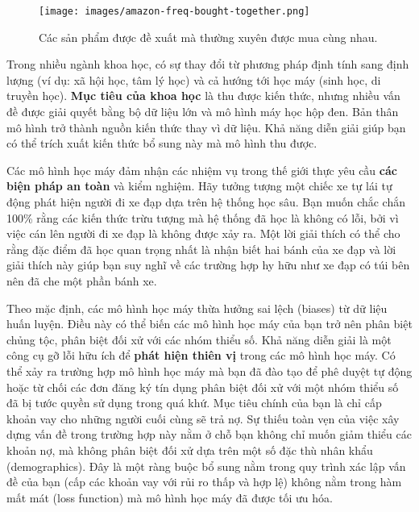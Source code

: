 \begin{figure*}[h!]
	\centering
	\texttt{[image: images/amazon-freq-bought-together.png]}
	\caption{Các sản phẩm được đề xuất mà thường xuyên được mua cùng nhau.}
\end{figure*}

Trong nhiều ngành khoa học, có sự thay đổi từ phương pháp định tính sang định lượng (ví dụ: xã hội học, tâm lý học) và cả hướng tới học máy (sinh học, di truyền học). \textbf{Mục tiêu của khoa học} là thu được kiến thức, nhưng nhiều vấn đề được giải quyết bằng bộ dữ liệu lớn và mô hình máy học hộp đen. Bản thân mô hình trở thành nguồn kiến thức thay vì dữ liệu. Khả năng diễn giải giúp bạn có thể trích xuất kiến thức bổ sung này mà mô hình thu được.

Các mô hình học máy đảm nhận các nhiệm vụ trong thế giới thực yêu cầu \textbf{các biện pháp an toàn} và kiểm nghiệm. Hãy tưởng tượng một chiếc xe tự lái tự động phát hiện người đi xe đạp dựa trên hệ thống học sâu. Bạn muốn chắc chắn 100\% rằng các kiến thức trừu tượng mà hệ thống đã học là không có lỗi, bởi vì việc cán lên người đi xe đạp là không được xảy ra. Một lời giải thích có thể cho rằng đặc điểm đã học quan trọng nhất là nhận biết hai bánh của xe đạp và lời giải thích này giúp bạn suy nghĩ về các trường hợp hy hữu như xe đạp có túi bên nên đã che một phần bánh xe.

Theo mặc định, các mô hình học máy thừa hưởng sai lệch (biases) từ dữ liệu huấn luyện. Điều này có thể biến các mô hình học máy của bạn trở nên phân biệt chủng tộc, phân biệt đối xử với các nhóm thiểu số. Khả năng diễn giải là một công cụ gỡ lỗi hữu ích để \textbf{phát hiện thiên vị}  trong các mô hình học máy. Có thể xảy ra trường hợp mô hình học máy mà bạn đã đào tạo để phê duyệt tự động hoặc từ chối các đơn đăng ký tín dụng phân biệt đối xử với một nhóm thiểu số đã bị tước quyền sử dụng trong quá khứ. Mục tiêu chính của bạn là chỉ cấp khoản vay cho những người cuối cùng sẽ trả nợ. Sự thiếu toàn vẹn của việc xây dựng vấn đề trong trường hợp này nằm ở chỗ bạn không chỉ muốn giảm thiểu các khoản nợ, mà không phân biệt đối xử dựa trên một số đặc thù nhân khẩu (demographics). Đây là một ràng buộc bổ sung nằm trong quy trình xác lập vấn đề của bạn (cấp các khoản vay với rủi ro thấp và hợp lệ) không nằm trong hàm mất mát (loss function) mà mô hình học máy đã được tối ưu hóa.

